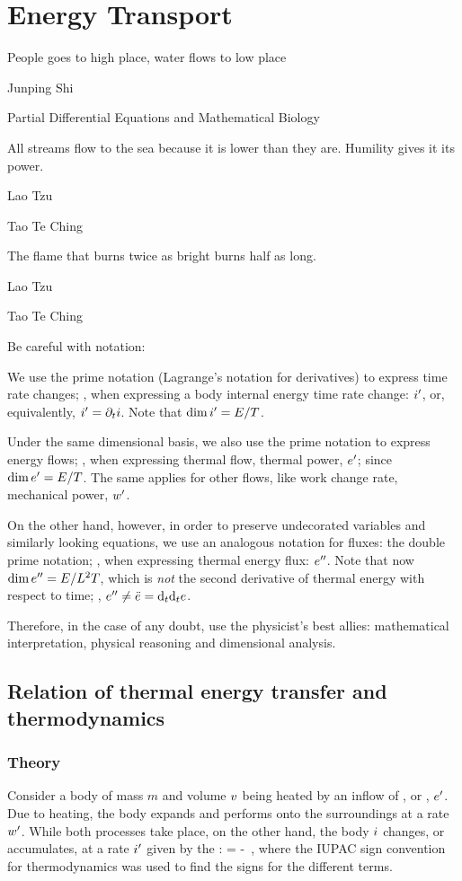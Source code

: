 \section{Energy Transport}
\epigraph{People goes to high place, water flows to low place}{Junping Shi}
    {Partial Differential Equations and Mathematical Biology}
\epigraph{All streams flow to the sea because it is lower than they are. Humility gives it its power.}{Lao Tzu}{Tao Te Ching}
\epigraph{The flame that burns twice as bright burns half as long.}{Lao Tzu}{Tao Te Ching}

Be careful with notation:

\begin{caution}
We use the prime notation (Lagrange's notation for derivatives) to express time rate changes; \eg, when expressing a body internal energy time rate change: ${i}^{\prime}$, or, equivalently, ${i}^{\prime} = \partial_{t}i$. Note that $\dim{i}^{\prime} = E/T$.

Under the same dimensional basis, we also use the prime notation to express energy flows; \eg, when expressing thermal flow, \aka thermal power, ${e}^{\prime}$; since $\dim{e}^{\prime} = E/T$. The same applies for other flows, like work change rate, \aka mechanical power, ${w}^{\prime}$.

On the other hand, however, in order to preserve undecorated variables and similarly looking equations, we use an analogous notation for fluxes: the double prime notation; \eg, when expressing thermal energy flux: ${e}^{\prime\prime}$. Note that now $\dim{e}^{\prime\prime} = E/L^2T$, which is \emph{not} the second derivative of thermal energy with respect to time; \ie, ${e}^{\prime\prime} \neq \ddot{e} = \text{d}_{t}{\text{d}_{t}e}$.

Therefore, in the case of any doubt, use the physicist's best allies: mathematical interpretation, physical reasoning and dimensional analysis.
\end{caution}


\subsection{Relation of thermal energy transfer and thermodynamics}

\subsubsection{Theory}
Consider a body of mass $m$ and volume $v$ being heated by an inflow of ,  or , ${e}^{\prime}$. Due to heating, the body expands and performs  onto the surroundings at a rate ${w}^{\prime}$. While both processes take place, on the other hand, the body  $i$ changes, or accumulates, at a rate ${i}^{\prime}$ given by the :
\beq
\rate\ien = \flow\then - \flow\work\,,
\eeq
where the IUPAC sign convention for thermodynamics was used to find the signs for the different terms.

